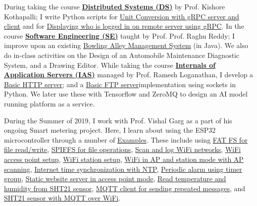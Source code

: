 During taking the course \textbf{\href{https://github.com/iiithf/distributed-systems}{Distributed Systems (DS)}} by Prof. Kishore Kothapalli; I write Python scripts for \href{https://github.com/python3f/grpc-unit-conversion}{Unit Conversion with gRPC server and client} and for \href{https://github.com/python3f/grpc-who}{Displaying who is logged in on remote server using gRPC}. In the course \textbf{\href{https://github.com/iiithf/software-engineering}{Software Engineering (SE)}} taught by Prof. Prof. Raghu Reddy; I improve upon an existing \href{https://github.com/javaf/bowling-alley}{Bowling Alley Management System} (in Java). We also do in-class activities on the Design of an Automobile Maintenance Diagnostic System, and a Drawing Editor. While taking the course \textbf{\href{https://github.com/iiithf/internals-of-application-servers}{Internals of Application Servers (IAS)}} managed by Prof. Ramesh Loganathan, I develop a \href{https://github.com/python3f/http-socket-server}{Basic HTTP server}; and a \href{https://github.com/python3f/ftp-socket-server}{Basic FTP server}implementation using sockets in Python. We later use these with Tensorflow and ZeroMQ to design an AI model running platform as a service.

During the Summer of 2019, I work with Prof. Vishal Garg as a part of his ongoing Smart metering project. Here, I learn about using the ESP32 microcontroller through a number of \href{https://github.com/iiithf/esp32-examples}{Examples}. These include using \href{https://github.com/esp32f/storage_fatfs}{FAT FS for file read/write}, \href{https://github.com/esp32f/storage_spiffs}{SPIFFS for file operations}, \href{https://github.com/esp32f/wifi_scan}{Scan and log WiFi networks}, \href{https://github.com/esp32f/wifi_ap}{WiFi access point setup}, \href{https://github.com/esp32f/wifi_sta}{WiFi station setup}, \href{https://github.com/esp32f/wifi_apsta}{WiFi in AP and station mode with AP scanning}, \href{https://github.com/esp32f/sntp_sync}{Internet time synchronization with NTP}, \href{https://github.com/esp32f/timer_alarm}{Periodic alarm using timer group}, \href{https://github.com/esp32f/http_server}{Static website server in access point mode}, \href{https://github.com/esp32f/sensor_sht21}{Read temperature and humidity from SHT21 sensor}, \href{https://github.com/esp32f/mqtt_client}{MQTT client for sending repeated messages}, and \href{https://github.com/esp32f/mqtt_sht21}{SHT21 sensor with MQTT over WiFi}.


